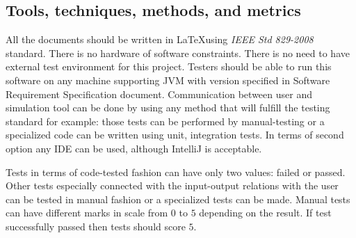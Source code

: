 \subsection{Tools, techniques, methods, and metrics} \label{s:introduction:tools-techniques-methods-and-metrics}
	\begin{comment}
		$<$Describe documents, hardware and software, test tools, techniques, methods, and test environment to be used in the test process. Describe the techniques that will be used to identify and capture reusable testware. Include information regarding acquisition, training, support, and qualification for each tool, technology, and method.\\
		Document the metrics to be used by the test effort, and describe how these metrics support the test objectives. Metrics appropriate to the Level Test Plans (e.g., component, component integration, system, and acceptance) may be included in those documents (see Annex E). $>$
	\end{comment}
	All the documents should be written in \LaTeX using \emph{IEEE Std 829-2008} standard. There is no hardware of software constraints. There is no need to have external test environment for this project. Testers should be able to run this software on any machine supporting JVM with version specified in Software Requirement Specification document. Communication between user and simulation tool can be done by using any method that will fulfill the testing standard for example: those tests can be performed by manual-testing or a specialized code can be written using unit, integration tests. In terms of second option any IDE can be used, although IntelliJ is acceptable.
	
	Tests in terms of code-tested fashion can have only two values: failed or passed. Other tests especially connected with the input-output relations with the user can be tested in manual fashion or a specialized tests can be made. Manual tests can have different marks in scale from $0$ to $5$ depending on the result. If test successfully passed then tests should score $5$.